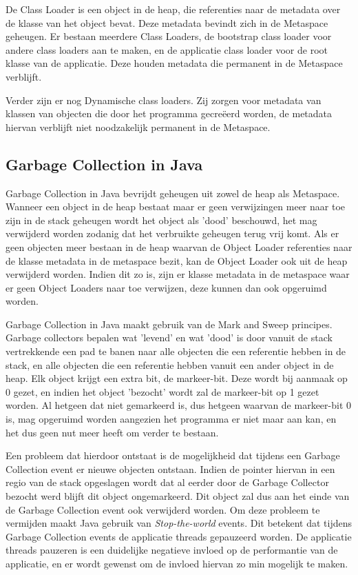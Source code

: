 De Class Loader is een object in de heap, die referenties naar de metadata over de klasse van het object bevat.
Deze metadata bevindt zich in de Metaspace geheugen.
Er bestaan meerdere Class Loaders, de bootstrap class loader voor andere class loaders aan te maken, en de applicatie class loader voor de root klasse van de applicatie.
Deze houden metadata die permanent in de Metaspace verblijft.

Verder zijn er nog Dynamische class loaders. Zij zorgen voor metadata van klassen van objecten die door het programma gecreëerd worden, de metadata hiervan verblijft niet noodzakelijk permanent in de Metaspace.
\autocite{Putten2022}
\subsection{Garbage Collection in Java}
\label{sec:garbage collection}
Garbage Collection in Java bevrijdt geheugen uit zowel de heap als Metaspace.
Wanneer een object in de heap bestaat maar er geen verwijzingen meer naar toe zijn in de stack geheugen wordt het object als 'dood' beschouwd, het mag verwijderd worden zodanig dat het verbruikte geheugen terug vrij komt.
Als er geen objecten meer bestaan in de heap waarvan de Object Loader referenties naar de klasse metadata in de metaspace bezit, kan de Object Loader ook uit de heap verwijderd worden.
Indien dit zo is, zijn er klasse metadata in de metaspace waar er geen Object Loaders naar toe verwijzen, deze kunnen dan ook opgeruimd worden. \autocite{Putten2022}

Garbage Collection in Java maakt gebruik van de Mark and Sweep principes.
Garbage collectors bepalen wat 'levend' en wat 'dood' is door vanuit de stack vertrekkende een pad te banen naar alle objecten die een referentie hebben in de stack, en alle objecten die een referentie hebben vanuit een ander object in de heap.
Elk object krijgt een extra bit, de markeer-bit. Deze wordt bij aanmaak op 0 gezet, en indien het object 'bezocht' wordt zal de markeer-bit op 1 gezet worden.
Al hetgeen dat niet gemarkeerd is, dus hetgeen waarvan de markeer-bit 0 is, mag opgeruimd worden aangezien het programma er niet maar aan kan, en het dus geen nut meer heeft om verder te bestaan.


Een probleem dat hierdoor ontstaat is de mogelijkheid dat tijdens een Garbage Collection event er nieuwe objecten ontstaan.
Indien de pointer hiervan in een regio van de stack opgeslagen wordt dat al eerder door de Garbage Collector bezocht werd blijft dit object ongemarkeerd.
Dit object zal dus aan het einde van de Garbage Collection event ook verwijderd worden.
Om deze probleem te vermijden maakt Java gebruik van \textit{Stop-the-world} events.
Dit betekent dat tijdens Garbage Collection events de applicatie threads gepauzeerd worden.
De applicatie threads pauzeren is een duidelijke negatieve invloed op de performantie van de applicatie, en er wordt gewenst om de invloed hiervan zo min mogelijk te maken.
\autocite{Putten2022}



